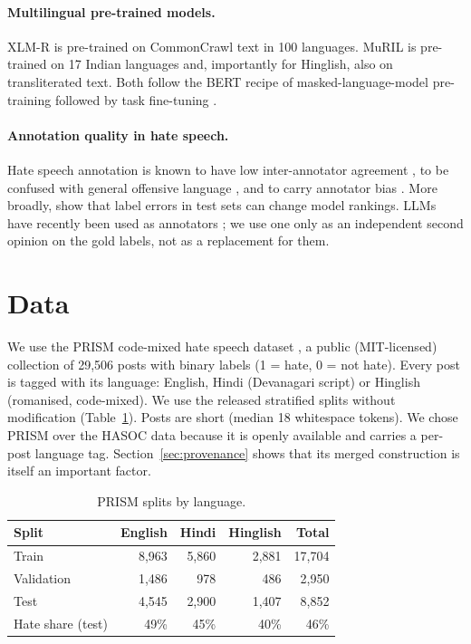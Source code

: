 \documentclass[11pt,a4paper]{article}
\begin{document}
\paragraph{Multilingual pre-trained models.}
XLM-R \citep{conneau2020xlmr} is pre-trained on CommonCrawl text in 100 languages.
MuRIL \citep{khanuja2021muril} is pre-trained on 17 Indian languages and, importantly for Hinglish, also on transliterated text.
Both follow the BERT recipe of masked-language-model pre-training followed by task fine-tuning \citep{devlin2019bert}.

\paragraph{Annotation quality in hate speech.}
Hate speech annotation is known to have low inter-annotator agreement \citep{ross2016measuring}, to be confused with general offensive language \citep{davidson2017automated}, and to carry annotator bias \citep{sap2019risk}.
More broadly, \citet{northcutt2021pervasive} show that label errors in test sets can change model rankings.
LLMs have recently been used as annotators \citep{gilardi2023chatgpt}; we use one only as an independent second opinion on the gold labels, not as a replacement for them.

\section{Data}

We use the PRISM code-mixed hate speech dataset \citep{prism}, a public (MIT-licensed) collection of 29,506 posts with binary labels (1 = hate, 0 = not hate).
Every post is tagged with its language: English, Hindi (Devanagari script) or Hinglish (romanised, code-mixed).
We use the released stratified splits without modification (Table~\ref{tab:data}).
Posts are short (median 18 whitespace tokens).
We chose PRISM over the HASOC data because it is openly available and carries a per-post language tag. Section~\ref{sec:provenance} shows that its merged construction is itself an important factor.

\begin{table}[h]
\centering
\small
\begin{tabular}{lrrrr}
\toprule
Split & English & Hindi & Hinglish & Total \\
\midrule
Train & 8,963 & 5,860 & 2,881 & 17,704 \\
Validation & 1,486 & 978 & 486 & 2,950 \\
Test & 4,545 & 2,900 & 1,407 & 8,852 \\
\midrule
Hate share (test) & 49\% & 45\% & 40\% & 46\% \\
\bottomrule
\end{tabular}
\caption{PRISM splits by language.}
\label{tab:data}
\end{table}
\end{document}
